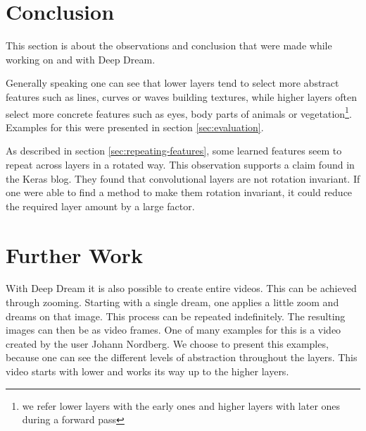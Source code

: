 \section{Conclusion}
\label{sec:conclusion}
This section is about the observations and conclusion that were made while working on and with Deep Dream.

Generally speaking one can see that lower layers tend to select more abstract features such as lines, curves or waves building textures, while higher layers often select more concrete features such as eyes, body parts of animals or vegetation\footnote{we refer lower layers with the early ones and higher layers with later ones during a forward pass}. Examples for this were presented in section \ref{sec:evaluation}.

As described in section \ref{sec:repeating-features}, some learned features seem to repeat across layers in a rotated way.
This observation supports a claim found in the Keras blog.\cite{keras-blog}
They found that convolutional layers are not rotation invariant.
If one were able to find a method to make them rotation invariant, it could reduce the required layer amount by a large factor.


\section{Further Work}
With Deep Dream it is also possible to create entire videos.
This can be achieved through zooming.
Starting with a single dream, one applies a little zoom and dreams on that image. This process can be repeated indefinitely.
The resulting images can then be as video frames.
One of many examples for this is a video created by the user Johann Nordberg.\cite{deep-dream-video}
We choose to present this examples, because one can see the different levels of abstraction throughout the layers.
This video starts with lower and works its way up to the higher layers.


